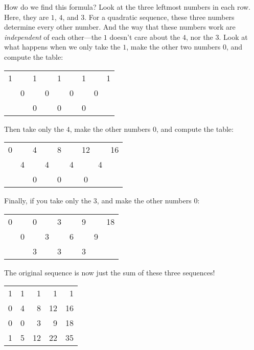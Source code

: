 \documentclass[11pt,paper=letter]{scrartcl}
\begin{document}
How do we find this formula? Look at the three leftmost numbers in each row. Here, they are $1$, $4$, and $3$. For a quadratic sequence, these three numbers determine every other number. And the way that these numbers work are \textit{independent} of each other---the $1$ doesn't care about the $4$, nor the $3$. Look at what happens when we only take the $1$, make the other two numbers $0$, and compute the table:

\begin{center}
\begin{tabular}{ccccccccc}
1 &   & 1 &   &  1 &    & 1 &    & 1 \\
  & 0 &   & 0 &    & 0  &    &  0 & \\
  &   & 0 &   & 0  &    & 0  &    &
\end{tabular}
\end{center}

Then take only the $4$, make the other numbers $0$, and compute the table:

\begin{center}
\begin{tabular}{ccccccccc}
0 &   & 4 &   &  8 &    & 12 &    & 16 \\
  & 4 &   & 4 &    & 4  &    &  4 & \\
  &   & 0 &   & 0  &    & 0  &    &
\end{tabular}
\end{center}

Finally, if you take only the $3$, and make the other numbers $0$:

\begin{center}
\begin{tabular}{ccccccccc}
0 &   & 0 &   &  3 &    &  9 &    & 18 \\
  & 0 &   & 3 &    & 6  &    &  9 & \\
  &   & 3 &   & 3  &    & 3  &    &
\end{tabular}
\end{center}

The original sequence is now just the sum of these three sequences!

\begin{center}
\begin{tabular}{rrrrr}
1 & 1 & 1 & 1 & 1 \\
0 & 4 & 8 &12 &16 \\
0 & 0 & 3 & 9 &18 \\ \hline
1 & 5 &12 &22 &35
\end{tabular}
\end{center}
\end{document}
